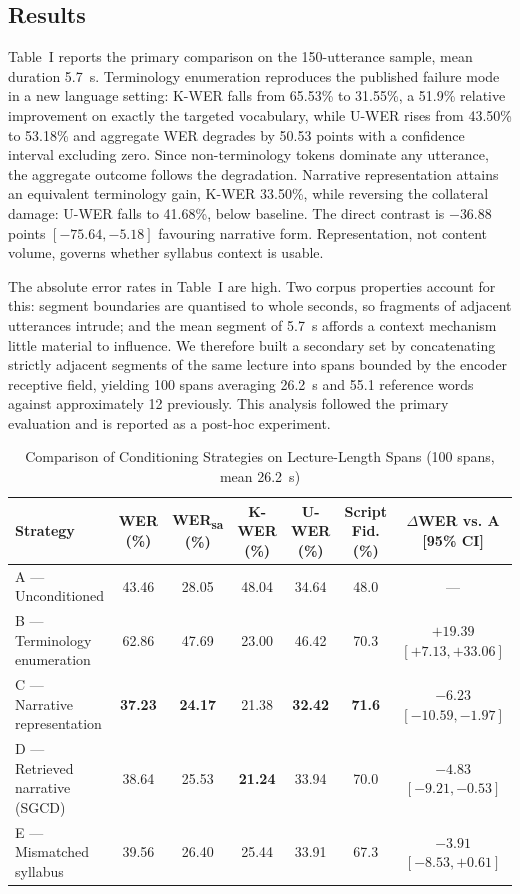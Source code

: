 \documentclass[conference]{IEEEtran}
\begin{document}
\subsection{Results}

Table~I reports the primary comparison on the 150-utterance sample, mean duration
5.7~s. Terminology enumeration reproduces the published failure mode
\cite{sun2023contextual} in a new language setting: K-WER falls from 65.53\% to
31.55\%, a 51.9\% relative improvement on exactly the targeted vocabulary, while
U-WER rises from 43.50\% to 53.18\% and aggregate WER degrades by 50.53 points
with a confidence interval excluding zero. Since non-terminology tokens dominate
any utterance, the aggregate outcome follows the degradation. Narrative
representation attains an equivalent terminology gain, K-WER 33.50\%, while
reversing the collateral damage: U-WER falls to 41.68\%, below baseline. The
direct contrast is $-36.88$ points $[-75.64, -5.18]$ favouring narrative form.
Representation, not content volume, governs whether syllabus context is usable.

The absolute error rates in Table~I are high. Two corpus properties account for
this: segment boundaries are quantised to whole seconds, so fragments of adjacent
utterances intrude; and the mean segment of 5.7~s affords a context mechanism
little material to influence. We therefore built a secondary set by concatenating
strictly adjacent segments of the same lecture into spans bounded by the encoder
receptive field, yielding 100 spans averaging 26.2~s and 55.1 reference words
against approximately 12 previously. This analysis followed the primary
evaluation and is reported as a post-hoc experiment.

\begin{table}[htbp]
\caption{Comparison of Conditioning Strategies on Lecture-Length Spans (100 spans, mean 26.2~s)}
\label{tab:long}
\centering
\begin{tabular}{|l|c|c|c|c|c|c|}
\hline
\textbf{Strategy} & \textbf{WER (\%)} & \textbf{WER\textsubscript{sa} (\%)} &
\textbf{K-WER (\%)} & \textbf{U-WER (\%)} & \textbf{Script Fid. (\%)} &
\textbf{$\Delta$WER vs. A [95\% CI]} \\
\hline
A --- Unconditioned            & 43.46 & 28.05 & 48.04 & 34.64 & 48.0 & --- \\
B --- Terminology enumeration  & 62.86 & 47.69 & 23.00 & 46.42 & 70.3 & $+19.39$ $[+7.13, +33.06]$ \\
C --- Narrative representation & \textbf{37.23} & \textbf{24.17} & 21.38 & \textbf{32.42} & \textbf{71.6} & $\mathbf{-6.23}$ $[-10.59, -1.97]$ \\
\hline
D --- Retrieved narrative (SGCD) & 38.64 & 25.53 & \textbf{21.24} & 33.94 & 70.0 & $-4.83$ $[-9.21, -0.53]$ \\
E --- Mismatched syllabus        & 39.56 & 26.40 & 25.44 & 33.91 & 67.3 & $-3.91$ $[-8.53, +0.61]$ \\
\hline
\end{tabular}
\end{table}
\end{document}
